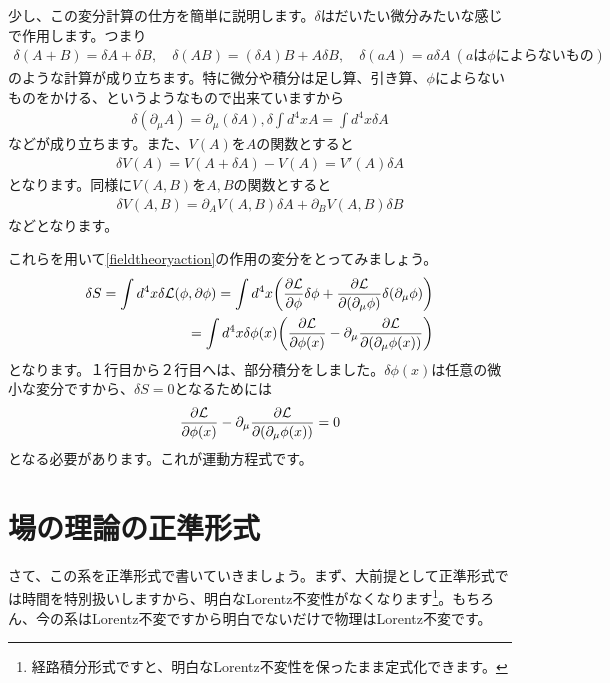 \documentclass[report,paper=a4, fontsize=12pt, line_length=16cm, number_of_lines=33,dvipdfmx]{jlreq}
\numberwithin{equation}{chapter}
\newcommand{\del}{\partial}
\newcommand{\Lcal}{\mathcal{L}}
\begin{document}
少し、この変分計算の仕方を簡単に説明します。$\delta$はだいたい微分みたいな感じで作用します。つまり
\begin{align}
  \delta(A+B)=\delta A+\delta B,\quad \delta(AB)=(\delta A)B+A\delta B,\quad
  \delta(aA)=a\delta A\ (a\text{は$\phi$によらないもの})
\end{align}
のような計算が成り立ちます。特に微分や積分は足し算、引き算、$\phi$によらないものをかける、というようなもので出来ていますから
\begin{align}
  \delta(\del_{\mu}A)=\del_{\mu}(\delta A),\delta \int d^4x A=\int d^4x\delta A
\end{align}
などが成り立ちます。また、$V(A)$を$A$の関数とすると
\begin{align}
  \delta V(A)=V(A+\delta A)-V(A)=V'(A)\delta A
\end{align}
となります。同様に$V(A,B)$を$A,B$の関数とすると
\begin{align}
  \delta V(A,B)=\del_{A}V(A,B)\delta A+\del_{B}V(A,B)\delta B
\end{align}
などとなります。

これらを用いて\eqref{fieldtheoryaction}の作用の変分をとってみましょう。
\begin{align}
  \delta S=\int d^4x \delta \Lcal(\phi,\del \phi)
  =\int d^4 x \qty(
    \pdv{\Lcal}{\phi}\delta \phi+\pdv{\Lcal}{(\del_{\mu}\phi)}\delta(\del_{\mu}\phi)
  )\nonumber \\
  =\int d^4 x \delta \phi(x) \qty(
    \pdv{\Lcal}{\phi(x)}-\del_{\mu}\pdv{\Lcal}{(\del_{\mu}\phi(x))}
  )
\end{align}
となります。１行目から２行目へは、部分積分をしました。$\delta \phi(x)$は任意の微小な変分ですから、$\delta S=0$となるためには
\begin{align}
  \pdv{\Lcal}{\phi(x)}-\del_{\mu}\pdv{\Lcal}{(\del_{\mu}\phi(x))}=0
\end{align}
となる必要があります。これが運動方程式です。

\section{場の理論の正準形式}
さて、この系を正準形式で書いていきましょう。まず、大前提として正準形式では時間を特別扱いしますから、明白なLorentz不変性がなくなります\footnote{経路積分形式ですと、明白なLorentz不変性を保ったまま定式化できます。}。もちろん、今の系はLorentz不変ですから明白でないだけで物理はLorentz不変です。
\end{document}
